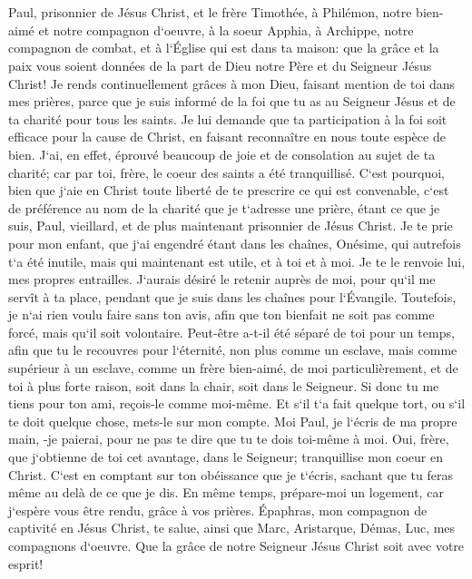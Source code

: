 

\chapter{}

\verse Paul, prisonnier de Jésus Christ, et le frère Timothée, à Philémon, notre bien-aimé et notre compagnon d`oeuvre, 
\verse à la soeur Apphia, à Archippe, notre compagnon de combat, et à l`Église qui est dans ta maison: 
\verse que la grâce et la paix vous soient données de la part de Dieu notre Père et du Seigneur Jésus Christ! 
\verse Je rends continuellement grâces à mon Dieu, faisant mention de toi dans mes prières, 
\verse parce que je suis informé de la foi que tu as au Seigneur Jésus et de ta charité pour tous les saints. 
\verse Je lui demande que ta participation à la foi soit efficace pour la cause de Christ, en faisant reconnaître en nous toute espèce de bien. 
\verse J`ai, en effet, éprouvé beaucoup de joie et de consolation au sujet de ta charité; car par toi, frère, le coeur des saints a été tranquillisé. 
\verse C`est pourquoi, bien que j`aie en Christ toute liberté de te prescrire ce qui est convenable, 
\verse c`est de préférence au nom de la charité que je t`adresse une prière, étant ce que je suis, Paul, vieillard, et de plus maintenant prisonnier de Jésus Christ. 
\verse Je te prie pour mon enfant, que j`ai engendré étant dans les chaînes, Onésime, 
\verse qui autrefois t`a été inutile, mais qui maintenant est utile, et à toi et à moi. 
\verse Je te le renvoie lui, mes propres entrailles. 
\verse J`aurais désiré le retenir auprès de moi, pour qu`il me servît à ta place, pendant que je suis dans les chaînes pour l`Évangile. 
\verse Toutefois, je n`ai rien voulu faire sans ton avis, afin que ton bienfait ne soit pas comme forcé, mais qu`il soit volontaire. 
\verse Peut-être a-t-il été séparé de toi pour un temps, afin que tu le recouvres pour l`éternité, 
\verse non plus comme un esclave, mais comme supérieur à un esclave, comme un frère bien-aimé, de moi particulièrement, et de toi à plus forte raison, soit dans la chair, soit dans le Seigneur. 
\verse Si donc tu me tiens pour ton ami, reçois-le comme moi-même. 
\verse Et s`il t`a fait quelque tort, ou s`il te doit quelque chose, mets-le sur mon compte. 
\verse Moi Paul, je l`écris de ma propre main, -je paierai, pour ne pas te dire que tu te dois toi-même à moi. 
\verse Oui, frère, que j`obtienne de toi cet avantage, dans le Seigneur; tranquillise mon coeur en Christ. 
\verse C`est en comptant sur ton obéissance que je t`écris, sachant que tu feras même au delà de ce que je dis. 
\verse En même temps, prépare-moi un logement, car j`espère vous être rendu, grâce à vos prières. 
\verse Épaphras, mon compagnon de captivité en Jésus Christ, 
\verse te salue, ainsi que Marc, Aristarque, Démas, Luc, mes compagnons d`oeuvre. 
\verse Que la grâce de notre Seigneur Jésus Christ soit avec votre esprit! 
